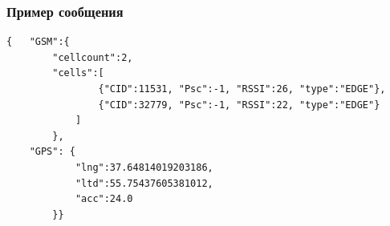 \documentclass{beamer}
\begin{document}



\begin{frame}[fragile]
	\frametitle{Пример сообщения}
	\begin{lstlisting}
{	"GSM":{
		"cellcount":2, 
		"cells":[
				{"CID":11531, "Psc":-1, "RSSI":26, "type":"EDGE"}, 
				{"CID":32779, "Psc":-1, "RSSI":22, "type":"EDGE"}
			]
		},
	"GPS": {
			"lng":37.64814019203186,
			"ltd":55.75437605381012,
			"acc":24.0
		}}
	\end{lstlisting}
\end{frame}
\end{document}
